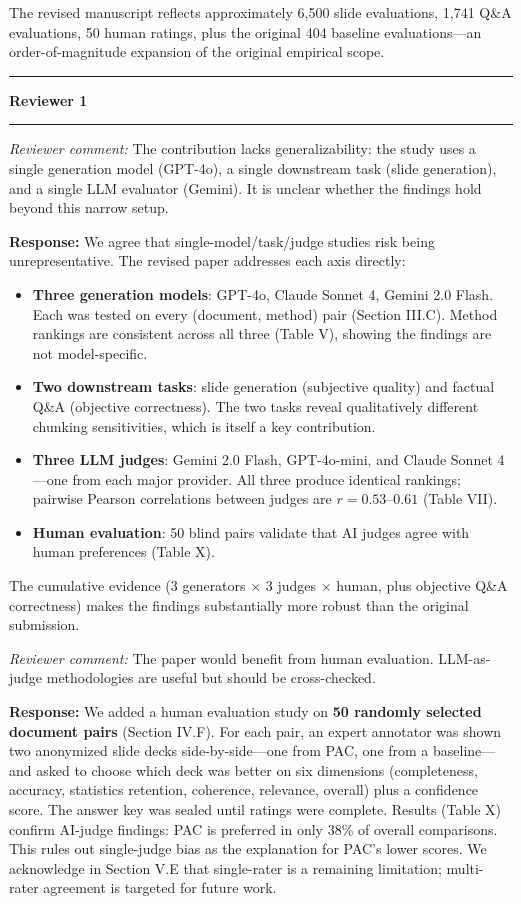 \documentclass[11pt]{article}
\newcommand{\reviewer}[1]{\noindent\textbf{\large Reviewer #1}\medskip\hrule\medskip}
\newcommand{\rcomment}[1]{\noindent\textcolor{revcomment}{\textit{Reviewer comment:}} #1\medskip}
\newcommand{\rresponse}[1]{\noindent\textcolor{response}{\textbf{Response:}} #1\medskip\medskip}
\begin{document}
The revised manuscript reflects approximately 6{,}500 slide evaluations, 1{,}741 Q\&A evaluations, 50 human ratings, plus the original 404 baseline evaluations---an order-of-magnitude expansion of the original empirical scope.

\bigskip
\hrule
\bigskip

\reviewer{1}

\rcomment{The contribution lacks generalizability: the study uses a single generation model (GPT-4o), a single downstream task (slide generation), and a single LLM evaluator (Gemini). It is unclear whether the findings hold beyond this narrow setup.}

\rresponse{We agree that single-model/task/judge studies risk being unrepresentative. The revised paper addresses each axis directly:
\begin{itemize}
    \item \textbf{Three generation models}: GPT-4o, Claude Sonnet 4, Gemini 2.0 Flash. Each was tested on every (document, method) pair (Section III.C). Method rankings are consistent across all three (Table V), showing the findings are not model-specific.
    \item \textbf{Two downstream tasks}: slide generation (subjective quality) and factual Q\&A (objective correctness). The two tasks reveal qualitatively different chunking sensitivities, which is itself a key contribution.
    \item \textbf{Three LLM judges}: Gemini 2.0 Flash, GPT-4o-mini, and Claude Sonnet 4---one from each major provider. All three produce identical rankings; pairwise Pearson correlations between judges are $r = 0.53$--$0.61$ (Table VII).
    \item \textbf{Human evaluation}: 50 blind pairs validate that AI judges agree with human preferences (Table X).
\end{itemize}
The cumulative evidence (3 generators $\times$ 3 judges $\times$ human, plus objective Q\&A correctness) makes the findings substantially more robust than the original submission.}

\rcomment{The paper would benefit from human evaluation. LLM-as-judge methodologies are useful but should be cross-checked.}

\rresponse{We added a human evaluation study on \textbf{50 randomly selected document pairs} (Section IV.F). For each pair, an expert annotator was shown two anonymized slide decks side-by-side---one from PAC, one from a baseline---and asked to choose which deck was better on six dimensions (completeness, accuracy, statistics retention, coherence, relevance, overall) plus a confidence score. The answer key was sealed until ratings were complete. Results (Table X) confirm AI-judge findings: PAC is preferred in only 38\% of overall comparisons. This rules out single-judge bias as the explanation for PAC's lower scores. We acknowledge in Section V.E that single-rater is a remaining limitation; multi-rater agreement is targeted for future work.}
\end{document}
